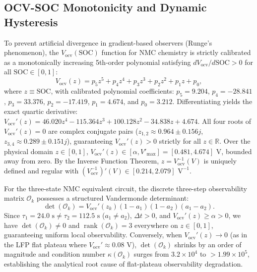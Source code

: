 \documentclass[balance,nocopyright,upint,varvw,hyphenate,barcolor=NavyBlue,nolists]{asmejour}
\begin{document}
\subsection{OCV-SOC Monotonicity and Dynamic Hysteresis}
To prevent artificial divergence in gradient-based observers (Runge's phenomenon), the $V_{\text{ocv}}(\text{SOC})$ function for NMC chemistry is strictly calibrated as a monotonically increasing 5th-order polynomial satisfying $d V_{\text{ocv}} / d\text{SOC} > 0$ for all $\text{SOC} \in [0, 1]$:
\begin{equation}\label{eqn:ocv_poly}
V_{\text{ocv}}(z) = p_5 z^5 + p_4 z^4 + p_3 z^3 + p_2 z^2 + p_1 z + p_0,
\end{equation}
where $z \equiv \text{SOC}$, with calibrated polynomial coefficients: $p_5 = 9.204$, $p_4 = -28.841$, $p_3 = 33.376$, $p_2 = -17.419$, $p_1 = 4.674$, and $p_0 = 3.212$. Differentiating yields the exact quartic derivative:
$V_{\text{ocv}}'(z) = 46.020 z^4 - 115.364 z^3 + 100.128 z^2 - 34.838 z + 4.674$. All four roots of $V_{\text{ocv}}'(z) = 0$ are complex conjugate pairs ($z_{1,2} \approx 0.964 \pm 0.156 j$, $z_{3,4} \approx 0.289 \pm 0.151 j$), guaranteeing $V_{\text{ocv}}'(z) > 0$ strictly for all $z \in \mathbb{R}$. Over the physical domain $z \in [0, 1]$, $V_{\text{ocv}}'(z) \in [\alpha, V'_{\max}] = [0.481, 4.674]\text{ V}$, bounded away from zero. By the Inverse Function Theorem, $z = V_{\text{ocv}}^{-1}(V)$ is uniquely defined and regular with $(V_{\text{ocv}}^{-1})'(V) \in [0.214, 2.079]\text{ V}^{-1}$.

For the three-state NMC equivalent circuit, the discrete three-step observability matrix $\mathcal{O}_k$ possesses a structured Vandermonde determinant:
\begin{equation}\label{eqn:det_obs}
\det(\mathcal{O}_k) = V_{\text{ocv}}'(z_k) (1 - a_1)(1 - a_2)(a_1 - a_2).
\end{equation}
Since $\tau_1 = 24.0\text{ s} \ne \tau_2 = 112.5\text{ s}$ ($a_1 \ne a_2$), $\Delta t > 0$, and $V_{\text{ocv}}'(z) \ge \alpha > 0$, we have $\det(\mathcal{O}_k) \ne 0$ and $\operatorname{rank}(\mathcal{O}_k) = 3$ everywhere on $z \in [0, 1]$, guaranteeing uniform local observability. Conversely, when $V_{\text{ocv}}'(z) \to 0$ (as in the LFP flat plateau where $V_{\text{ocv}}' \approx 0.08\text{ V}$), $\det(\mathcal{O}_k)$ shrinks by an order of magnitude and condition number $\kappa(\mathcal{O}_k)$ surges from $3.2 \times 10^4$ to $> 1.99 \times 10^5$, establishing the analytical root cause of flat-plateau observability degradation.
\end{document}
